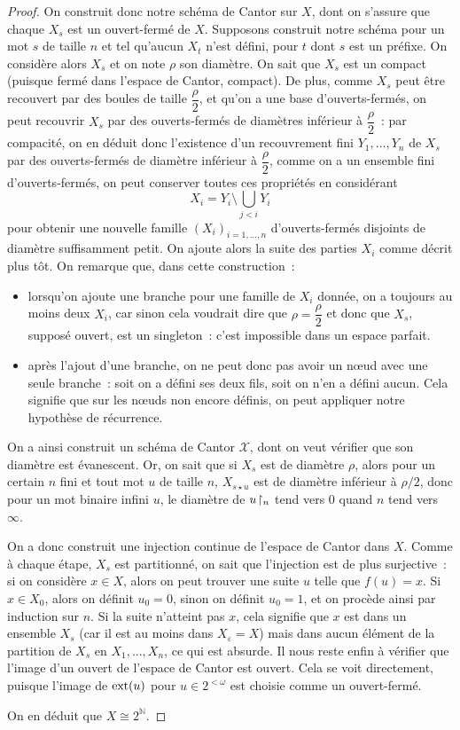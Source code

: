 \begin{proof}
  On construit donc notre schéma de Cantor sur $X$, dont on s'assure que
  chaque $X_s$ est un ouvert-fermé de $X$. Supposons construit notre schéma pour
  un mot $s$ de taille $n$ et tel qu'aucun $X_t$ n'est défini, pour $t$ dont
  $s$ est un préfixe. On considère alors $X_s$ et on note $\rho$ son diamètre.
  On sait que $X_s$ est un compact (puisque fermé dans l'espace de Cantor,
  compact). De plus, comme $X_s$ peut être recouvert par des boules de taille
  $\dfrac{\rho}{2}$, et qu'on a une base d'ouverts-fermés, on peut recouvrir
  $X_s$ par des ouverts-fermés de diamètres inférieur à $\dfrac{\rho}{2}$~: par
  compacité, on en déduit donc l'existence d'un recouvrement fini
  $Y_1,\ldots,Y_n$ de $X_s$ par des ouverts-fermés de diamètre inférieur à
  $\dfrac{\rho}{2}$, comme on a un ensemble fini d'ouverts-fermés, on peut
  conserver toutes ces propriétés en considérant
  \[X_i = Y_i \setminus \bigcup_{ j < i} Y_i\]
  pour obtenir une nouvelle famille $(X_i)_{i = 1,\ldots, n}$ d'ouverts-fermés
  disjoints de diamètre suffisamment petit. On ajoute alors la suite des
  parties $X_i$ comme décrit plus tôt. On remarque que, dans cette
  construction~:
  \begin{itemize}
  \item lorsqu'on ajoute une branche pour une famille de $X_i$ donnée, on
    a toujours au moins deux $X_i$, car sinon cela voudrait dire que
    $\rho = \dfrac{\rho}{2}$ et donc que $X_s$, supposé ouvert, est un
    singleton~: c'est impossible dans un espace parfait.
  \item après l'ajout d'une branche, on ne peut donc pas avoir un n\oe ud avec
    une seule branche~: soit on a défini ses deux fils, soit on n'en a
    défini aucun. Cela signifie que sur les n\oe uds non encore définis, on peut
    appliquer notre hypothèse de récurrence.
  \end{itemize}
  On a ainsi construit un schéma de Cantor $\mathcal X$, dont on veut vérifier
  que son diamètre est évanescent. Or, on sait que si $X_s$ est de diamètre
  $\rho$, alors pour un certain $n$ fini et tout mot $u$ de taille $n$,
  $X_{s\star u}$ est de diamètre inférieur à $\rho/2$, donc pour un mot
  binaire infini $u$, le diamètre de $u\!\upharpoonright_{n}$ tend vers $0$ quand $n$ tend
  vers $\infty$.

  On a donc construit une injection continue de l'espace de Cantor dans $X$.
  Comme à chaque étape, $X_s$ est partitionné, on sait que l'injection est de
  plus surjective~: si on considère $x \in X$, alors on peut trouver une suite
  $u$ telle que $f(u) = x$. Si $x \in X_0$, alors on définit $u_0 = 0$, sinon
  on définit $u_0 = 1$, et on procède ainsi par induction sur $n$. Si la suite
  n'atteint pas $x$, cela signifie que $x$ est dans un ensemble $X_s$ (car il
  est au moins dans $X_\varepsilon = X$) mais dans aucun élément de la partition
  de $X_s$ en $X_1,\ldots,X_n$, ce qui est absurde. Il nous reste enfin à
  vérifier que l'image d'un ouvert de l'espace de Cantor est ouvert. Cela se
  voit directement, puisque l'image de $\operatorname{ext}(u)$ pour $u\in 2^{<\omega}$ est
  choisie comme un ouvert-fermé.

  On en déduit que $X \cong 2^\mathbb N$.
\end{proof}

